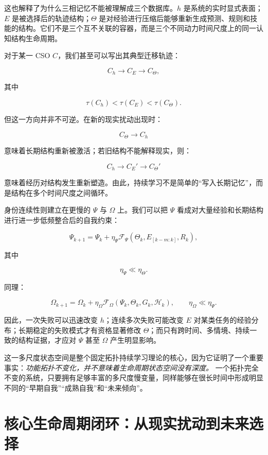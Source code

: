 \begin{statementbox}
\centering
{}
\end{statementbox}

这也解释了为什么三相记忆不能被理解成三个数据库。$h$ 是系统的实时显式表面；$E$ 是被选择后的轨迹结构；$\Theta$ 是对经验进行压缩后能够重新生成预测、规则和技能的结构。它们不是三个互不关联的容器，而是三个不同动力时间尺度上的同一认知结构生命周期。

对于某一 CSO $C$，我们甚至可以写出其典型迁移轨迹：

\[
C_h
\rightarrow
C_E
\rightarrow
C_\Theta,
\]

其中

\[
\tau(C_h)
<
\tau(C_E)
<
\tau(C_\Theta).
\]

但这一方向并非不可逆。在新的现实扰动出现时：

\[
C_\Theta
\rightarrow
C_h
\]

意味着长期结构重新被激活；若旧结构不能解释现实，则：

\[
C_h
\rightarrow
C_E'
\rightarrow
C_\Theta'
\]

意味着经历对结构发生重新塑造。由此，持续学习不是简单的“写入长期记忆”，而是结构在多个时间尺度之间循环。

身份连续性则建立在更慢的 $\Psi$ 与 $\Omega$ 上。我们可以把 $\Psi$ 看成对大量经验和长期结构进行进一步低频整合后的自我约束：

\[
\Psi_{k+1}
=
\Psi_k
+
\eta_\Psi
\mathcal{F}_\Psi
(
\Theta_k,
E_{[k-m:k]},
R_k
),
\]

其中

\[
\eta_\Psi
\ll
\eta_\Theta.
\]

同理：

\[
\Omega_{k+1}
=
\Omega_k
+
\eta_\Omega
\mathcal{F}_\Omega
(
\Psi_k,
\Theta_k,
G_k,
\mathcal{H}_k
),
\qquad
\eta_\Omega
\ll
\eta_\Psi.
\]

因此，一次失败可以迅速改变 $h$；连续多次失败可能改变 $E$ 对某类任务的经验分布；长期稳定的失败模式才有资格显著修改 $\Theta$；而只有跨时间、多情境、持续一致的结构证据，才应对 $\Psi$ 甚至 $\Omega$ 产生明显影响。

这一多尺度状态空间是整个固定拓扑持续学习理论的核心，因为它证明了一个重要事实：\emph{功能拓扑不变化，并不意味着生命周期状态空间没有深度。} 一个拓扑完全不变的系统，只要拥有足够丰富的多尺度慢变量，同样能够在很长时间中形成明显不同的“早期自我”“成熟自我”和“未来倾向”。

\section{核心生命周期闭环：从现实扰动到未来选择}

